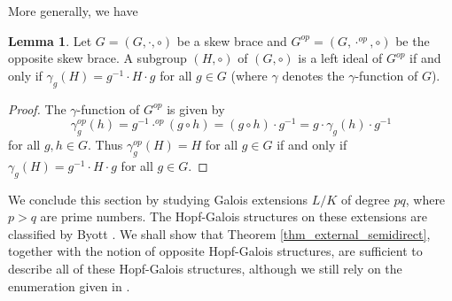 \documentclass[12pt,a4paper, reqno]{amsart}
\theoremstyle{definition}
\newtheorem{lemma}[theorem]{Lemma}
\begin{document}
More generally, we have

\begin{lemma} \label{lem_opposites}
Let $ G=(G,\cdot,\circ) $ be a skew brace and $ G^{op}=(G,\cdot^{op},\circ) $ be the opposite skew brace. A subgroup $ (H,\circ) $ of $ (G,\circ) $ is a left ideal of $ G^{op} $ if and only if $ \gamma_{g}(H)=g^{-1}\cdot H \cdot g $ for all $ g \in G $ (where $ \gamma $ denotes the $ \gamma $-function of $ G $). 
\end{lemma}
\begin{proof}
The $ \gamma $-function of $ G^{op} $ is given by
\[ \gamma^{op}_{g}(h) = g^{-1} \cdot^{op} (g \circ h) = (g \circ h) \cdot g^{-1} = g \cdot \gamma_{g}(h) \cdot g^{-1} \]
for all $ g,h \in G $. Thus $ \gamma^{op}_{g}(H)=H $ for all $ g \in G $ if and only if $ \gamma_{g}(H)=g^{-1}\cdot H \cdot g $ for all $ g \in G $.
\end{proof}

We conclude this section by studying Galois extensions $ L/K $ of degree $ pq $, where $ p>q $ are prime numbers. The Hopf-Galois structures on these extensions are classified by Byott \cite{By04c}. We shall show that Theorem \ref{thm_external_semidirect}, together with the notion of opposite Hopf-Galois structures, are sufficient to describe all of these Hopf-Galois structures, although we still rely on the enumeration given in \cite{By04c}.
\end{document}
